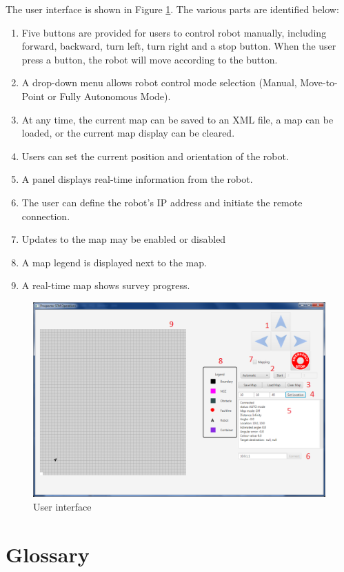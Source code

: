 \documentclass[12pt]{article}
\begin{document}
The user interface is shown in Figure \ref{fig:gui}. The various parts are identified below: 
\begin{enumerate}
\item  Five buttons are provided for users to control robot manually, including forward, backward, turn left, turn right and a stop button. When the user press a button, the robot will move according to the button.  
\item  A drop-down menu allows robot control mode selection (Manual, Move-to-Point or Fully Autonomous Mode). 
\item  At any time, the current map can be saved to an XML file, a map can be loaded, or the current map display can be cleared. 
\item  Users can set the current position and orientation of the robot.
\item  A panel displays real-time information from the robot.
\item  The user can define the robot's IP address and initiate the remote connection.
\item Updates to the map may be enabled or disabled
\item  A map legend is displayed next to the map.
\item  A real-time map shows survey progress.
\end{enumerate}

\begin{figure}[!htb]
\includegraphics[width=\textwidth]{gui.png}
\caption{User interface}
  \label{fig:gui}
\end{figure}

\FloatBarrier
\section{Glossary}\label{glossary}
\end{document}
